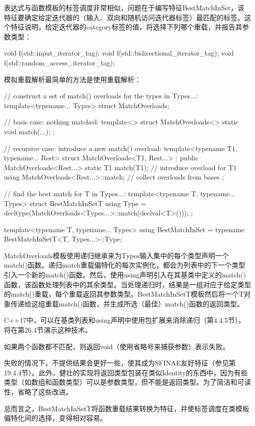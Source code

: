 表达式与函数模板的标签调度非常相似，问题在于编写特征BestMatchInSet，该特征要确定给定迭代器的（输入、双向和随机访问迭代器标签）最匹配的标签。这个特征说明，给定迭代器的category标签的值，将选择下列哪个重载，并报告其参数类型：

\begin{cpp}
void f(std::input_iterator_tag);
void f(std::bidirectional_iterator_tag);
void f(std::random_access_iterator_tag);
\end{cpp}

模拟重载解析最简单的方法是使用重载解析：

\begin{cpp}
// construct a set of match() overloads for the types in Types...:
template<typename... Types>
struct MatchOverloads;

// basis case: nothing matched:
template<>
struct MatchOverloads<> {
	static void match(...);
};

// recursive case: introduce a new match() overload:
template<typename T1, typename... Rest>
struct MatchOverloads<T1, Rest...> : public MatchOverloads<Rest...> {
	static T1 match(T1); // introduce overload for T1
	using MatchOverloads<Rest...>::match; // collect overloads from bases
};

// find the best match for T in Types...:
template<typename T, typename... Types>
struct BestMatchInSetT {
	using Type = decltype(MatchOverloads<Types...>::match(declval<T>()));
};

template<typename T, typename... Types>
using BestMatchInSet = typename BestMatchInSetT<T, Types...>::Type;
\end{cpp}

MatchOverloads模板使用递归继承来为Types输入集中的每个类型声明一个match()函数。递归match重载偏特化的每次实例化，都会为列表中的下一个类型引入一个新的match()函数。然后，使用using声明引入在其基类中定义的match()函数，该函数处理列表中的其余类型。当处理递归时，结果是一组对应于给定类型的match()重载，每个重载返回其参数类型。BestMatchInSetT模板然后将一个T对象传递给这组重载match()函数，并生成所选（最佳）match()函数的返回类型。

\begin{notice}
C++17中，可以在基类列表和using声明中使用包扩展来消除递归（第4.4.5节）。将在第26.4节演示这种技术。
\end{notice}

如果两个函数都不匹配，则返回void（使用省略号来捕获参数）表示失败。

\begin{notice}
失败的情况下，不提供结果会更好一些，使其成为SFINAE友好特征（参见第19.4.4节）。此外，健壮的实现将返回类型包装在类似Identity的东西中，因为有些类型（如数组和函数类型）可以是参数类型，但不能是返回类型。为了简洁和可读性，省略了这些改进。
\end{notice}

总而言之，BestMatchInSetT将函数重载结果转换为特征，并使标签调度在类模板偏特化间的选择，变得相对容易。










